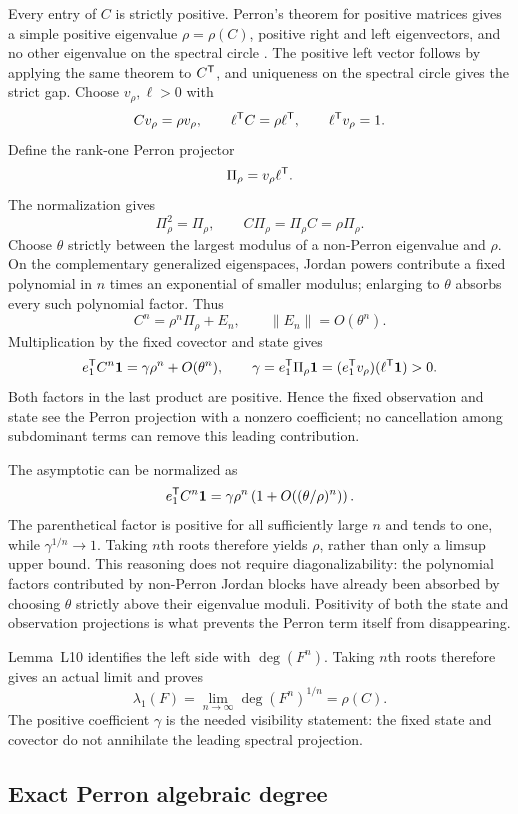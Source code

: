 \documentclass[11pt,letterpaper]{article}
\theoremstyle{plain}
\begin{document}
Every entry of $C$ is strictly positive.  Perron's theorem for positive matrices gives a simple positive eigenvalue $\rho=\rho(C)$, positive right and left eigenvectors, and no other eigenvalue on the spectral circle \cite[Section 8.2, p.~667]{StdMeyer2000MatrixAnalysis}.  The positive left vector follows by applying the same theorem to $C^{\mathsf{T}}$, and uniqueness on the spectral circle gives the strict gap.  Choose $v_\rho,\ell>0$ with
\[
Cv_\rho=\rho v_\rho,\qquad \ell^{\mathsf{T}}C=\rho\ell^{\mathsf{T}},
\qquad \ell^{\mathsf{T}}v_\rho=1.
\]
Define the rank-one Perron projector
\[
\Pi_\rho=v_\rho\ell^{\mathsf{T}}.
\]
The normalization gives
\[
\Pi_\rho^2=\Pi_\rho,\qquad
C\Pi_\rho=\Pi_\rho C=\rho\Pi_\rho.
\]
Choose $\theta$ strictly between the largest modulus of a non-Perron eigenvalue and $\rho$.  On the complementary generalized eigenspaces, Jordan powers contribute a fixed polynomial in $n$ times an exponential of smaller modulus; enlarging to $\theta$ absorbs every such polynomial factor.  Thus
\[
C^n=\rho^n\Pi_\rho+E_n,
\qquad
\lVert E_n\rVert=O(\theta^n).
\]
Multiplication by the fixed covector and state gives
\[
e_1^{\mathsf{T}}C^n\mathbf{1}
=\gamma\rho^n+O(\theta^n),
\qquad
\gamma=e_1^{\mathsf{T}}\Pi_\rho\mathbf{1}
=(e_1^{\mathsf{T}}v_\rho)(\ell^{\mathsf{T}}\mathbf{1})>0.
\]
Both factors in the last product are positive.  Hence the fixed observation and state see the Perron projection with a nonzero coefficient; no cancellation among subdominant terms can remove this leading contribution.

The asymptotic can be normalized as
\[
e_1^{\mathsf{T}}C^n\mathbf{1}
=\gamma\rho^n\left(1+O\!\left((\theta/\rho)^n\right)\right).
\]
The parenthetical factor is positive for all sufficiently large \(n\) and tends to one, while \(\gamma^{1/n}\to1\).  Taking \(n\)th roots therefore yields \(\rho\), rather than only a limsup upper bound.  This reasoning does not require diagonalizability: the polynomial factors contributed by non-Perron Jordan blocks have already been absorbed by choosing \(\theta\) strictly above their eigenvalue moduli.  Positivity of both the state and observation projections is what prevents the Perron term itself from disappearing.

Lemma~L10 identifies the left side with $\deg(F^n)$.  Taking $n$th roots therefore gives an actual limit and proves
\[
\lambda_1(F)=\lim_{n\to\infty}\deg(F^n)^{1/n}=\rho(C).
\]
The positive coefficient $\gamma$ is the needed visibility statement: the fixed state and covector do not annihilate the leading spectral projection.

\subsection{Exact Perron algebraic degree}
\end{document}
